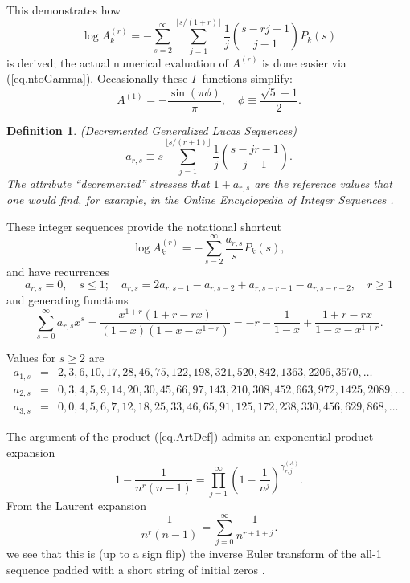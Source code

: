 \documentclass{amsart}
\newtheorem{defn}{Definition}
\begin{document}
This demonstrates how
\begin{equation}
\log A_k^{(r)}
=
- \sum_{s=2}^\infty \sum_{j=1}^{\lfloor s/(1+r)\rfloor} \frac{1}{j}\binom{s-rj-1}{j-1}P_k(s)
\label{eq.logAkr}
\end{equation}
is derived; the actual numerical
evaluation of $A^{(r)}$ is done easier via (\ref{eq.ntoGamma}).
Occasionally these $\Gamma$-functions simplify:
\begin{equation}
A^{(1)}= -\frac{\sin(\pi\phi)}{\pi},\quad  \phi\equiv \frac{\sqrt{5}+1}{2}.
\end{equation}


\begin{defn}
(Decremented Generalized Lucas Sequences)
\begin{equation}
a_{r,s}\equiv
s\sum_{j=1}^{\lfloor s/(r+1)\rfloor} \frac{1}{j}\binom{s-jr-1}{j-1}
.
\label{eq.arsdef}
\end{equation}
The attribute ``decremented'' stresses that $1+a_{r,s}$ are the reference
values that one would find, for example, in the Online Encyclopedia
of Integer Sequences \cite{EIS}.
\end{defn}
These integer sequences provide the notational shortcut
\begin{equation}
\log A_k^{(r)}= -\sum_{s=2}^\infty \frac{a_{r,s}}{s}P_k(s),
\label{eq.AkrofPks}
\end{equation}
and have recurrences
\begin{equation}
a_{r,s}=0,\quad s\le 1;\quad
a_{r,s} = 
2 a_{r,s-1}-a_{r,s-2}+a_{r,s-r-1}-a_{r,s-r-2},\quad  r\ge 1
\label{eq.arsrec}
\end{equation}
and generating functions
\begin{equation}
\sum_{s=0}^\infty a_{r,s} x^s = \frac{x^{1+r}(1+r-rx)}{(1-x)(1-x-x^{1+r})}
=
-r-\frac{1}{1-x}+\frac{1+r-rx}{1-x-x^{1+r}}
.
\label{eq.arsgf}
\end{equation}

Values for $s\ge 2$ are
\begin{eqnarray*}
a_{1,s} &=& 2,3,6,10,17,28,46,75,122,198,321,520,842,1363,2206,3570,\ldots
\\
a_{2,s} &=& 0,3,4,5,9,14,20,30,45,66,97,143,210,308,452,663,972,1425,2089,
\ldots
\\
a_{3,s} &=& 0,0,4,5,6,7,12,18,25,33,46,65,91,125,172,238,330,456,629,868,
\ldots
\end{eqnarray*}


The argument of the product (\ref{eq.ArtDef}) admits an exponential product
expansion \cite{MoreeMM101,Niklasch}
\begin{equation}
1-\frac{1}{n^r(n-1)} = \prod_{j=1}^\infty \left(1-\frac{1}{n^j}\right)^{\gamma_{r,j}^{(A)}}
.
\label{eq.gammADef}
\end{equation}
From the Laurent expansion
\begin{equation}
\frac{1}{n^r(n-1)} 
=
\sum_{j=0}^\infty \frac{1}{n^{r+1+j}}
.
\end{equation}
we see that this is (up to a sign flip) the inverse Euler transform
of the all-1 sequence padded with a short string of initial zeros \cite{CameronJIS3,BernsteinLAA226}.
\end{document}
